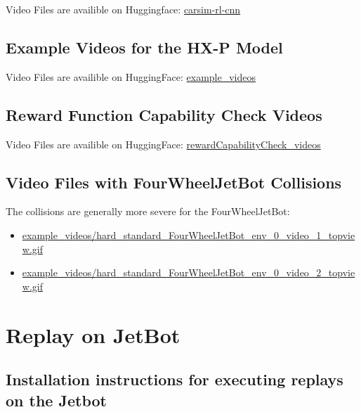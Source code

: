 Video Files are availible on Huggingface:
\href{https://huggingface.co/geschnee/carsim-rl-cnn/tree/main/}{carsim-rl-cnn}

\subsection{Example Videos for the \ac{HX-P} Model}

Video Files are availible on HuggingFace:
\href{https://huggingface.co/geschnee/carsim-rl-cnn/tree/main/example_videos}{example\_videos}


\subsection{Reward Function Capability Check Videos}
\label{sec:reward_capability_check_videos}

Video Files are availible on HuggingFace:
\href{https://huggingface.co/geschnee/carsim-rl-cnn/tree/main/rewardCapabilityCheck_videos}{rewardCapabilityCheck\_videos}

\subsection{Video Files with FourWheelJetBot Collisions}
\label{sec:fourwheel_collisions}

The collisions are generally more severe for the FourWheelJetBot:

\begin{itemize}
    \item \href{https://huggingface.co/geschnee/carsim-rl-cnn/blob/main/example_videos_FourWheelJetbot/hard_standard_FourWheelJetBot_env_0_video_1_topview.gif}{example\_videos/hard\_standard\_FourWheelJetBot\_env\_0\_video\_1\_topview.gif}
    \item \href{https://huggingface.co/geschnee/carsim-rl-cnn/blob/main/example_videos_FourWheelJetbot/hard_standard_FourWheelJetBot_env_0_video_2_topview.gif}{example\_videos/hard\_standard\_FourWheelJetBot\_env\_0\_video\_2\_topview.gif}
\end{itemize}

\section{Replay on JetBot}

\subsection{Installation instructions for executing replays on the Jetbot}

